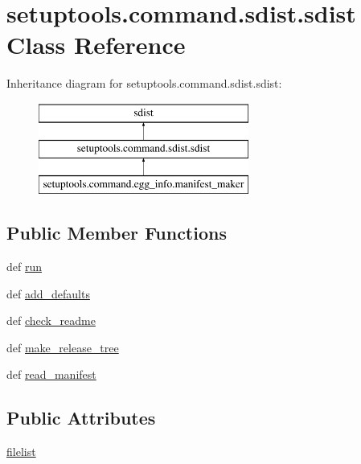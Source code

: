 \hypertarget{classsetuptools_1_1command_1_1sdist_1_1sdist}{}\section{setuptools.\+command.\+sdist.\+sdist Class Reference}
\label{classsetuptools_1_1command_1_1sdist_1_1sdist}
Inheritance diagram for setuptools.\+command.\+sdist.\+sdist\+:\begin{figure}[H]
\begin{center}
\leavevmode
\includegraphics[height=3.000000cm]{classsetuptools_1_1command_1_1sdist_1_1sdist}
\end{center}
\end{figure}
\subsection*{Public Member Functions}
\begin{DoxyCompactItemize}
\item 
def \hyperlink{classsetuptools_1_1command_1_1sdist_1_1sdist_af788badb9502f6c269e69a8dbcbbe83c}{run}
\item 
def \hyperlink{classsetuptools_1_1command_1_1sdist_1_1sdist_a605d641db43fa642ce17df17ce2a3e54}{add\+\_\+defaults}
\item 
def \hyperlink{classsetuptools_1_1command_1_1sdist_1_1sdist_affd09152cd22779dbf8c94d5e2dae734}{check\+\_\+readme}
\item 
def \hyperlink{classsetuptools_1_1command_1_1sdist_1_1sdist_a49fb42aec7e2173d7eebe59df676b31f}{make\+\_\+release\+\_\+tree}
\item 
def \hyperlink{classsetuptools_1_1command_1_1sdist_1_1sdist_a93ffe627b02d05fa9a0919356807832a}{read\+\_\+manifest}
\end{DoxyCompactItemize}
\subsection*{Public Attributes}
\begin{DoxyCompactItemize}
\item 
\hyperlink{classsetuptools_1_1command_1_1sdist_1_1sdist_a6a32cd8d6db51f0418ef5208afdb19bd}{filelist}
\end{DoxyCompactItemize}
